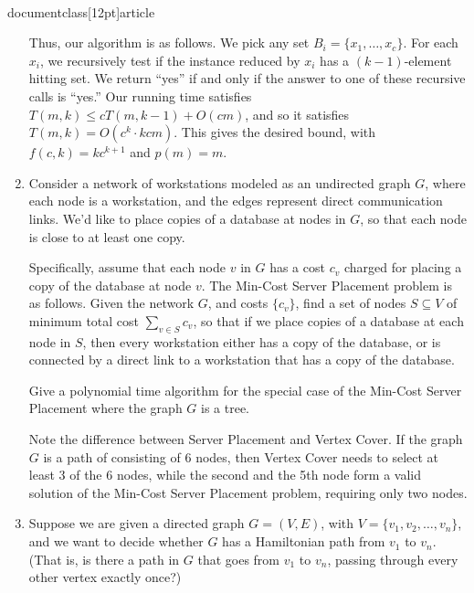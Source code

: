 \\documentclass[12pt]{article}
\begin{document}
\begin{enumerate}
{Thus, our algorithm is as follows.
We pick any set $B_i = \{x_1, \ldots, x_c\}$.
For each $x_i$, we recursively test if the
instance reduced by $x_i$ has a $(k-1)$-element hitting set.
We return ``yes'' if and only if the answer to one of
these recursive calls is ``yes.''
Our running time satisfies $T(m,k) \leq c T(m,k-1) + O(cm)$,
and so it satisfies $T(m,k) = O(c^k \cdot kcm)$.
This gives the desired bound, with 
$f(c,k) = kc^{k+1}$ and $p(m) = m$.

}


\item 

Consider a network of workstations modeled as 
an undirected graph $G$, where each node is a workstation, and the edges
represent direct communication links. 
We'd like to place copies of a database at nodes in $G$,
so that each node is close to at least one copy.

Specifically, assume that each node $v$ in $G$
has a cost $c_v$ charged for placing a copy of the database at node $v$. 
The {\sc Min-Cost Server Placement} problem is as follows.
Given the network $G$, and costs $\{c_v\}$, 
find a set of nodes $S \subseteq V$
of minimum total cost $\sum_{v \in S} c_v$, so that 
if we place copies of a database at each node in $S$,
then every workstation either has a copy of the database, or is
connected by a direct link to a workstation that has a copy of the database.

Give a polynomial time algorithm for the special case of the
{\sc Min-Cost Server Placement} where the graph $G$ is a tree.

Note the difference between {\sc Server Placement} and {\sc Vertex Cover}.
If the graph $G$ is a path of consisting of 6 nodes, then {\sc Vertex Cover}
needs to select at least 3 of the 6 nodes, while the second and the 5th node
form a valid solution of the 
{\sc Min-Cost Server Placement} problem, requiring only two nodes.





\item 

Suppose we are given a directed graph $G = (V,E)$,
with $V = \{v_1, v_2, \ldots, v_n\}$, and we want
to decide whether $G$ has a Hamiltonian path
from $v_1$ to $v_n$.
(That is, is there a path in $G$ that goes from
$v_1$ to $v_n$, passing through every other vertex exactly once?)


\end{enumerate}
\end{document}

